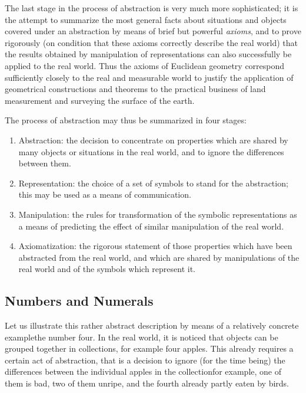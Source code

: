 The last stage in the process of abstraction is very much more sophisticated; it is the attempt to summarize the most general facts about situations and objects covered under an abstraction by means of brief but powerful \textit{axioms}, and to prove rigorously (on condition that these axioms correctly describe the real world) that the results obtained by manipulation of representations can also successfully be applied to the real world. Thus the axioms of Euclidean geometry correspond sufficiently closely to the real and measurable world to justify the application of geometrical constructions and theorems to the practical business of land measurement and surveying the surface of the earth.

The process of abstraction may thus be summarized in four stages:

\begin{enumerate}[wide, nosep, label=(\arabic*)]
	\item Abstraction: the decision to concentrate on properties which are shared  by many objects or situations in the real world, and to ignore the differences between them.
	\item Representation: the choice of a set of symbols to stand for the abstraction; this may be used as a means of communication.
	\item Manipulation: the rules for transformation of the symbolic representations as a means of predicting the effect of similar manipulation of the real world.
	\item Axiomatization: the rigorous statement of those properties which have been abstracted from the real world, and which are shared by manipulations of the real world and of the symbols which represent it.
\end{enumerate}

\subsection{Numbers and Numerals}
Let us illustrate this rather abstract description by means of a relatively concrete example\textemdash{}the number four. In the real world, it is noticed that objects can be grouped together in collections, for example four apples. This already requires a certain act of abstraction, that is a decision to ignore (for the time being) the differences between the individual apples in the collection\textemdash{}for example, one of them is bad, two of them unripe, and the fourth already partly eaten by birds.

